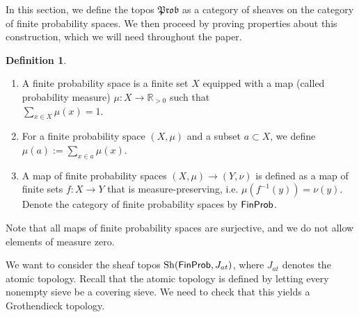 \documentclass[a4paper]{amsproc}
\theoremstyle{plain}
\theoremstyle{definition}
\newtheorem{definition}[theorem]{Definition}
\theoremstyle{remark}
\numberwithin{equation}{section}
\DeclareMathOperator{\Sh}{Sh}
\newcommand{\FinProb}{\textup{\textsf{FinProb}}}
\newcommand{\Prob}{\mathfrak{Prob}}
\begin{document}
In this section, we define the topos $\Prob$ as a category of sheaves on the category of finite probability spaces. We then proceed by proving properties about this construction, which we will need throughout the paper.


\begin{definition}
    \mbox{}
    \begin{enumerate}
        \item A finite probability space is a finite set $X$ equipped with a map (called probability measure) $\mu: X \to \mathbb{R}_{>0}$ such that \\ $\sum_{x \in X} \mu(x) = 1$.
        \item For a finite probability space $(X,\mu)$ and a subset $a \subset X$, we define $\mu(a) := \sum_{x \in a} \mu(x)$.
        \item A map of finite probability spaces $(X,\mu) \to (Y,\nu)$ is defined as a map of finite sets $f: X \to Y$ that is measure-preserving, i.e. $\mu(f^{-1}(y)) = \nu(y)$. Denote the category of finite probability spaces by $\FinProb$.
    \end{enumerate}
\end{definition}

Note that all maps of finite probability spaces are surjective, and we do not allow elements of measure zero.

We want to consider the sheaf topos $\Sh(\FinProb, J_{at})$, where $J_{at}$ denotes the atomic topology. Recall that the atomic topology is defined by letting every nonempty sieve be a covering sieve. We need to check that this yields a Grothendieck topology.
\end{document}
